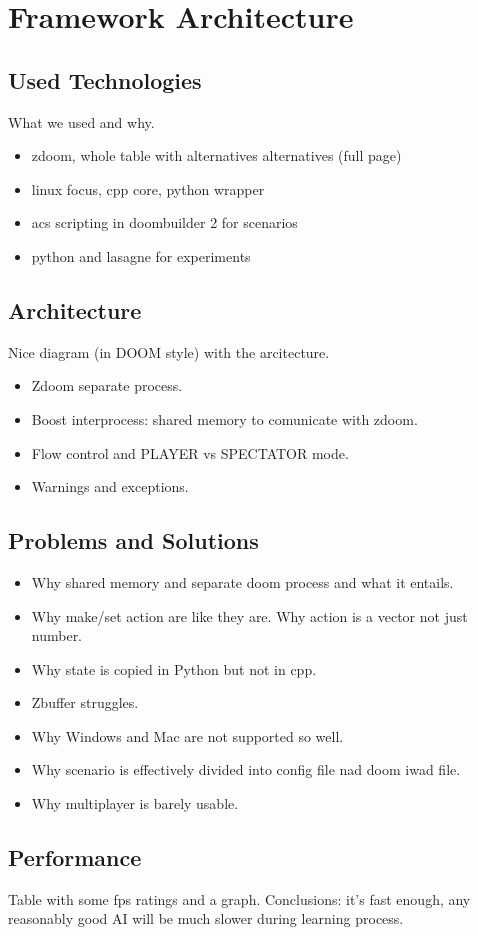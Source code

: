 
\chapter{Framework Architecture}

\section{Used Technologies}
What we used and why.
\begin{itemize}
\item zdoom, whole table with alternatives alternatives (full page)
\item linux focus, cpp core, python wrapper
\item acs scripting in doombuilder 2 for scenarios
\item python and lasagne for experiments
\end{itemize}

\section{Architecture}
Nice diagram (in DOOM style) with the arcitecture.
\begin{itemize}
\item Zdoom separate process.
\item Boost interprocess: shared memory to comunicate with zdoom.
\item Flow control and PLAYER vs SPECTATOR mode.
\item Warnings and exceptions.
\end{itemize}

\section{Problems and Solutions}
\begin{itemize}
\item Why shared memory and separate doom process and what it entails.
\item Why make/set action are like they are. Why action is a vector not just number.
\item Why state is copied in Python but not in cpp.
\item Zbuffer struggles.
\item Why Windows and Mac are not supported so well.
\item Why scenario is effectively divided into config file nad doom iwad file.
\item Why multiplayer is barely usable.
\end{itemize}

\section{Performance}
Table with some fps ratings and a graph.
Conclusions: it's fast enough, any reasonably good AI will be much slower during learning process.



